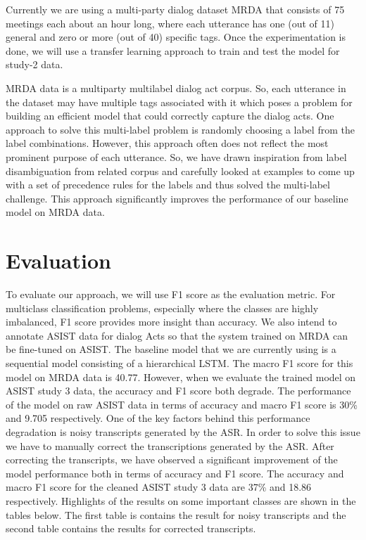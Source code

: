 Currently we are using a multi-party dialog dataset MRDA
\citep{Shriberg.ea:2004} that consists of 75 meetings each about an hour long,
where each utterance has one (out of 11) general and zero or more (out of 40)
specific tags. Once the experimentation is done, we will use a transfer
learning approach to train and test the model for study-2 data. 

MRDA data is a multiparty multilabel dialog act corpus. So, each utterance in
the dataset may have multiple tags associated with it which poses a problem for
building an efficient model that could correctly capture the dialog acts. One approach
to solve this multi-label problem is randomly choosing a label from 
the label combinations. However, this approach often does not reflect the most
prominent purpose of each utterance. So, we have drawn inspiration from label
disambiguation from related corpus and carefully looked at examples to come up
with a set of precedence rules for the labels and thus solved the multi-label
challenge. This approach significantly improves the performance of our baseline
model on MRDA data.

\section{Evaluation}

To evaluate our approach, we will use F1 score as the evaluation metric. For
multiclass classification problems, especially where the classes are highly
imbalanced, F1 score provides more insight than accuracy.  We also intend to
annotate ASIST data for dialog Acts so that the system trained on MRDA can be
fine-tuned on ASIST. The baseline model that we are currently using is a sequential
model consisting of a hierarchical LSTM. The macro F1 score for this model on MRDA
data is 40.77. However, when we evaluate the trained model on ASIST study 3 data, 
the accuracy and F1 score both degrade. The performance of the model on raw ASIST
data in terms of accuracy and macro F1 score is 30\% and 9.705 respectively. 
One of the key factors behind this performance degradation is noisy transcripts 
generated by the ASR. In order to solve this issue we have to manually correct the
transcriptions generated by the ASR. After correcting the transcripts, we have
observed a significant improvement of the model performance both in terms of accuracy
and F1 score. The accuracy and macro F1 score for the cleaned ASIST study 3 data are 
37\% and 18.86 respectively. Highlights of the results on some important classes are 
shown in the tables below. The first table is contains the result for noisy transcripts 
and the second table contains the results for corrected transcripts.

